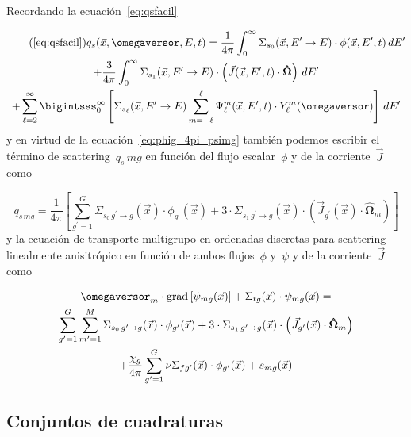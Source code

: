 \medskip

Recordando la ecuación~\eqref{eq:qsfacil}

\begin{multline}\tag{\ref{eq:qsfacil}}
 q_s(\vec{x}, \omegaversor, E, t) =
\frac{1}{4\pi} \int_{0}^{\infty} \Sigma_{s_0}(\vec{x}, E^{\prime} \rightarrow E) \cdot \phi(\vec{x}, E^{\prime}, t) \, dE^\prime \\
+ \frac{3}{4\pi} \int_{0}^{\infty} \Sigma_{s_1}(\vec{x}, E^{\prime} \rightarrow E) \cdot \left(\vec{J}(\vec{x},E^{\prime},t) \cdot \boldsymbol{\hat\Omega}\right) \, dE^\prime  \\
+ \sum_{\ell=2}^\infty \bigintsss_{0}^{\infty}   \left[ \Sigma_{s_\ell}(\vec{x}, E^{\prime} \rightarrow E) 
\sum_{m=-\ell}^{\ell} \Psi_\ell^m (\vec{x}, E^{\prime}, t) \cdot Y_\ell^{m}(\omegaversor)  \right] \, dE^{\prime}
\end{multline}
%
y en virtud de la ecuación~\eqref{eq:phig_4pi_psimg} también podemos escribir el término de scattering~$q_s\,mg$ en función del flujo escalar~$\phi$ y de la corriente~$\vec{J}$ como

\begin{equation*}
 q_{s \, mg} =
\frac{1}{4\pi} \left[ \sum_{g^\prime=1}^{G} \Sigma_{s_0 \, g^\prime \rightarrow g}(\vec{x}) \cdot \phi_{g^\prime}(\vec{x})
+ 3 \cdot \Sigma_{s_1 \, g^\prime \rightarrow g}(\vec{x}) \cdot \left( \vec{J}_{g^\prime}(\vec{x}) \cdot \boldsymbol{\hat\Omega}_m  \right) \right]
\end{equation*}
%
y la ecuación de transporte multigrupo en ordenadas discretas para scattering linealmente anisitrópico en función de ambos flujos~$\phi$ y~$\psi$ y de la corriente~$\vec{J}$ como

\begin{multline}\label{eq:transporte_mgx}
 \omegaversor_m \cdot \text{grad} \left[ \psi_{mg}(\vec{x}) \right]
 + \Sigma_{t g}(\vec{x}) \cdot \psi_{mg}(\vec{x}) = \nonumber \\
 \sum_{g^\prime=1}^G \sum_{m^\prime=1}^M \Sigma_{s_0 \, g^\prime \rightarrow g}(\vec{x}) \cdot \phi_{g^\prime}(\vec{x})
+ 3 \cdot \Sigma_{s_1 \, g^\prime \rightarrow g}(\vec{x}) \cdot \left( \vec{J}_{g^\prime}(\vec{x}) \cdot \boldsymbol{\hat\Omega}_m  \right) \nonumber \\
+ \frac{\chi_g}{4\pi} \sum_{g^\prime=1}^G \nu\Sigma_{fg^\prime}(\vec{x}) \cdot \phi_{g^\prime}(\vec{x})
+ s_{mg}(\vec{x})
\end{multline}


\subsection{Conjuntos de cuadraturas} %
\label{sec:cuadraturas}

